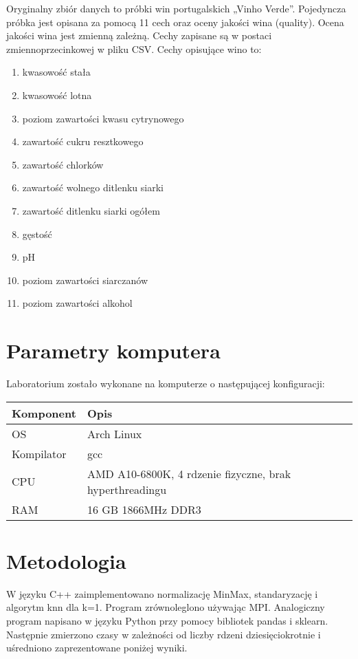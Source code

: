 \documentclass{scrartcl}
\begin{document}
Oryginalny zbiór danych to próbki win portugalskich „Vinho Verde”.
Pojedyncza próbka jest opisana za pomocą 11 cech oraz oceny jakości wina (quality). Ocena jakości wina jest zmienną zależną. Cechy zapisane są w postaci
zmiennoprzecinkowej w pliku CSV.
Cechy opisujące wino to:
\begin{enumerate}
\item kwasowość stała
\item kwasowość lotna
\item poziom zawartości kwasu cytrynowego
\item zawartość cukru resztkowego
\item zawartość chlorków
\item zawartość wolnego ditlenku siarki
\item zawartość ditlenku siarki ogółem
\item gęstość
\item pH
\item poziom zawartości siarczanów
\item poziom zawartości alkohol
\end{enumerate}

\section{Parametry komputera}
Laboratorium zostało wykonane na komputerze o następującej konfiguracji:
\begin{table}[h]
    \centering
    \begin{tabular}{llr}
\hline

\cline{1-2}
Komponent   & Opis  \\
\hline
OS      & Arch Linux    \\

Kompilator      & gcc    \\

CPU      & AMD A10-6800K, 4 rdzenie fizyczne, brak hyperthreadingu    \\
          
RAM       & 16 GB 1866MHz DDR3           \\

\hline
\end{tabular}
\end{table}

\section{Metodologia}
W języku C++ zaimplementowano normalizację MinMax, standaryzację i algorytm knn
dla k=1. Program zrównoleglono używając MPI. Analogiczny program napisano w języku Python przy pomocy bibliotek pandas i sklearn. Następnie zmierzono czasy w zależności od liczby rdzeni dziesięciokrotnie i uśredniono zaprezentowane poniżej wyniki.
\end{document}

